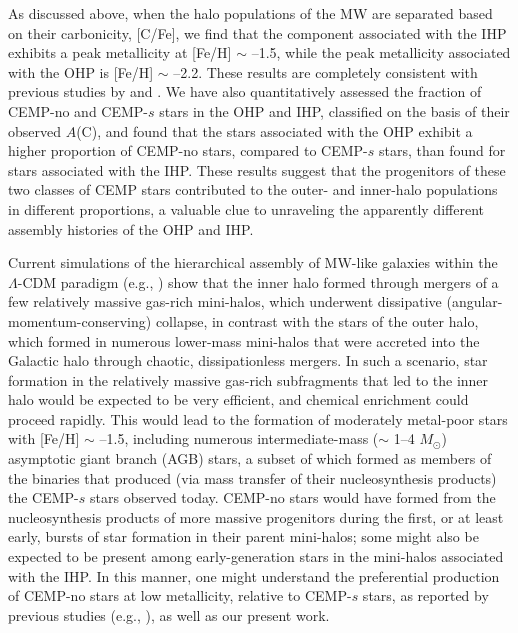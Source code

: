\documentclass[iop]{emulateapj}
\newcommand*{\ac}{$A$(C)}
\newcommand*{\msun}{$M_\odot$}
\begin{document}
As discussed above, when the halo populations of the MW are separated
based on their carbonicity, [C/Fe], we find that the component
associated with the IHP exhibits a peak metallicity at [Fe/H] $\sim$
--1.5, while the peak metallicity associated with the OHP is [Fe/H]
$\sim$ --2.2. These results are completely consistent with previous
studies by \citet{carollo2007, carollo2010} and \citet{an2013, an2015}.
We have also quantitatively assessed the fraction of CEMP-no and
CEMP-$s$ stars in the OHP and IHP, classified on the basis of their
observed \ac, and found that the stars associated with the OHP exhibit a
higher proportion of CEMP-no stars, compared to CEMP-$s$ stars, than
found for stars associated with the IHP. These results suggest that the
progenitors of these two classes of CEMP stars contributed to the outer-
and inner-halo populations in different proportions, a valuable clue to
unraveling the apparently different assembly histories of the OHP and
IHP.

Current simulations of the hierarchical assembly of MW-like galaxies
within the $\Lambda$-CDM paradigm (e.g., \citealt{tissera2012,
tissera2013, tissera2014}) show that the inner halo formed through
mergers of a few relatively massive gas-rich mini-halos, which underwent
dissipative (angular-momentum-conserving) collapse, in contrast with the
stars of the outer halo, which formed in numerous lower-mass mini-halos
that were accreted into the Galactic halo through chaotic,
dissipationless mergers. In such a scenario, star formation in the
relatively massive gas-rich subfragments that led to the inner halo
would be expected to be very efficient, and chemical enrichment could
proceed rapidly. This would lead to the formation of moderately
metal-poor stars with [Fe/H] $\sim$ --1.5, including numerous
intermediate-mass ($\sim$ 1--4 \msun) asymptotic giant branch (AGB)
stars, a subset of which formed as members of the binaries that produced
(via mass transfer of their nucleosynthesis products) the CEMP-$s$ stars
observed today. CEMP-no stars would have formed from the nucleosynthesis
products of more massive progenitors during the first, or at least
early, bursts of star formation in their parent mini-halos; some might
also be expected to be present among early-generation stars in the
mini-halos associated with the IHP. In this manner, one might understand
the preferential production of CEMP-no stars at low metallicity,
relative to CEMP-$s$ stars, as reported by previous studies (e.g.,
\citealt{aoki2007, placco2014, yoon2016}), as well as our present work.
\end{document}
